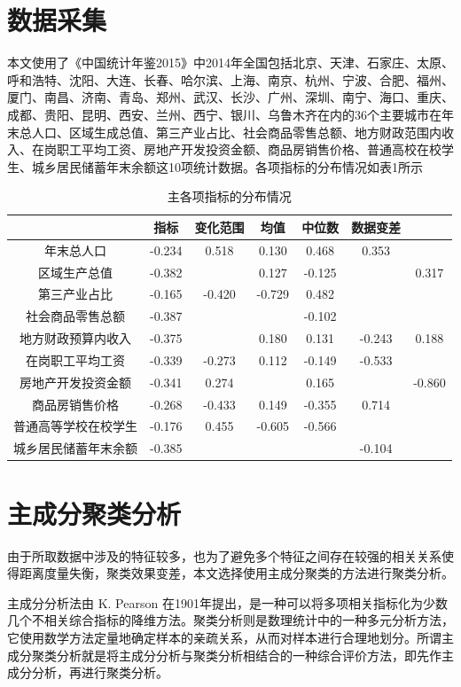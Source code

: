 \documentclass [a4paper]{article}
\begin{document}
\section{数据采集}
本文使用了《中国统计年鉴2015》中2014年全国包括北京、天津、石家庄、太原、呼和浩特、沈阳、大连、长春、哈尔滨、上海、南京、杭州、宁波、合肥、福州、厦门、南昌、济南、青岛、郑州、武汉、长沙、广州、深圳、南宁、海口、重庆、成都、贵阳、昆明、西安、兰州、西宁、银川、乌鲁木齐在内的36个主要城市在年末总人口、区域生成总值、第三产业占比、社会商品零售总额、地方财政范围内收入、在岗职工平均工资、房地产开发投资金额、商品房销售价格、普通高校在校学生、城乡居民储蓄年末余额这10项统计数据。各项指标的分布情况如表1所示
\begin{table}[h]
\centering
\caption{主各项指标的分布情况}
\small %
\begin{tabular}{ccccccc}
\toprule
&指标&变化范围&均值 &中位数 &数据变差\\
\midrule

年末总人口    &      -0.234 & 0.518 & 0.130 & 0.468 & 0.353  \\
区域生产总值  &      -0.382 &  & 0.127 & -0.125 &    & 0.317 \\
第三产业占比   &     -0.165 & -0.420 & -0.729 & 0.482&      \\
社会商品零售总额   &  -0.387 &     &     &-0.102 &     &   \\
地方财政预算内收入  & -0.375 &     & 0.180 & 0.131 & -0.243 & 0.188 \\
在岗职工平均工资  &  -0.339 & -0.273 & 0.112 & -0.149 & -0.533 &        \\
房地产开发投资金额  & -0.341 & 0.274 &      & 0.165 &    & -0.860     \\
商品房销售价格  &    -0.268 & -0.433 & 0.149 & -0.355 & 0.714     \\
普通高等学校在校学生& -0.176& 0.455 & -0.605 & -0.566 &       &       \\
城乡居民储蓄年末余额&  -0.385&     &      &    &-0.104&   \\
\bottomrule
\end{tabular}
\end{table}
\section{主成分聚类分析}
由于所取数据中涉及的特征较多，也为了避免多个特征之间存在较强的相关关系使得距离度量失衡，聚类效果变差，本文选择使用主成分聚类的方法进行聚类分析。

主成分分析法由 K. Pearson 在1901年提出，是一种可以将多项相关指标化为少数几个不相关综合指标的降维方法。聚类分析则是数理统计中的一种多元分析方法， 它使用数学方法定量地确定样本的亲疏关系，从而对样本进行合理地划分。所谓主成分聚类分析就是将主成分分析与聚类分析相结合的一种综合评价方法，即先作主成分分析，再进行聚类分析。
\end{document}

